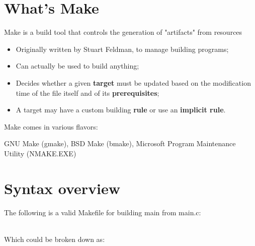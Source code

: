 \section{What's Make}

\begin{frame}{\secname}
    Make is a build tool that controls the generation of "artifacts" from resources

    \begin{itemize}
        \item Originally written by Stuart Feldman, to manage building programs;
        \item Can actually be used to build anything;
        \item Decides whether a given \textbf{target} must be updated based on the modification time of the file itself and of its \textbf{prerequisites};
        \item A target may have a custom building \textbf{rule} or use an \textbf{implicit rule}.
    \end{itemize}

    Make comes in various flavors:

    GNU Make (gmake), BSD Make (bmake), Microsoft Program Maintenance Utility (NMAKE.EXE)
\end{frame}



\section{Syntax overview}
\begin{frame}{\secname}
    The following is a valid Makefile for building main from main.c: \\~\\

    \makeMain

    Which could be broken down as: \\~\\

    \makeSyntax

\end{frame}

